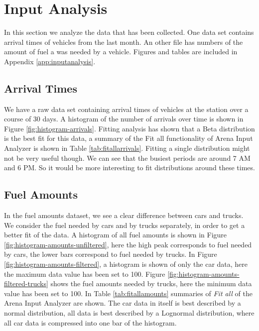 \section{Input Analysis}

In this section we analyze the data that has been collected. One data set contains arrival times of vehicles from the last month. An other file has numbers of the amount of fuel a was needed by a vehicle.  Figures and tables are included in Appendix \ref{app:inputanalysis}.

\subsection{Arrival Times}

We have a raw data set containing arrival times of vehicles at the station over a course of 30 days. 
A histogram of the number of arrivals over time is shown in Figure \ref{fig:histogram-arrivals}. 
Fitting analysis has shown that a Beta distribution is the best fit for this data, a summary of the Fit all functionality of Arena Input Analyzer is shown in Table \ref{tab:fitallarrivals}. 
Fitting a single distribution might not be very useful though. 
We can see that the busiest periods are around 7 AM and 6 PM. 
So it would be more interesting to fit distributions around these times. 

\subsection{Fuel Amounts}

In the fuel amounts dataset, we see a clear difference between cars and trucks.
We consider the fuel needed by cars and by trucks separately, in order to get a better fit of the data.
A histogram of all fuel amounts is shown in Figure \ref{fig:histogram-amounts-unfiltered}, here the high peak corresponds to fuel needed by cars, the lower bars correspond to fuel needed by trucks.
In Figure \ref{fig:histogram-amounts-filtered}, a histogram is shown of only the car data, here the maximum data value has been set to 100.
Figure \ref{fig:histogram-amounts-filtered-trucks} shows the fuel amounts needed by trucks, here the minimum data value has been set to 100.
In Table \ref{tab:fitallamounts} summaries of \textit{Fit all} of the Arena Input Analyzer are shown.
The car data in itself is best described by a normal distribution, all data is best described by a Lognormal distribution, where all car data is compressed into one bar of the histogram.





